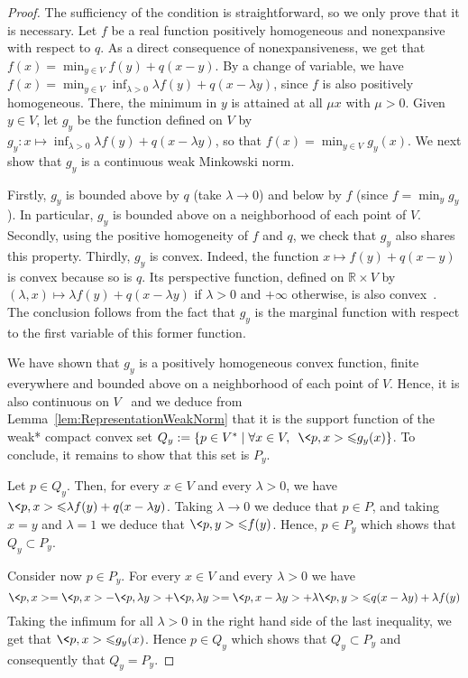 \documentclass[a4paper,11pt]{amsart}
\theoremstyle{definition}
\theoremstyle{remark}
\begin{document}
\begin{proof}
  The sufficiency of the condition is straightforward, so we only prove that it is necessary.
  Let $f$ be a real function positively homogeneous and nonexpansive with respect to $q$.
  As a direct consequence of nonexpansiveness, we get that $f(x) = \min_{y \in V} f(y)+q(x-y)$.
  By a change of variable, we have $f(x) = \min_{y \in V} \inf_{\lambda > 0} \lambda f(y)+q(x-\lambda y)$, since $f$ is also positively homogeneous.
  There, the minimum in $y$ is attained at all $\mu x$ with $\mu > 0$.
  Given $y \in V$, let $g_y$ be the function defined on $V$ by $g_y:x \mapsto \inf_{\lambda > 0} \lambda f(y)+q(x-\lambda y)$, so that $f(x)= \min_{y \in V} g_y(x)$.
  We next show that $g_y$ is a continuous weak Minkowski norm.

  Firstly, $g_y$ is bounded above by $q$ (take $\lambda \to 0$) and below by $f$ (since $f = \min_{y} g_y$).
  In particular, $g_y$ is bounded above on a neighborhood of each point of $V$.
  Secondly, using the positive homogeneity of $f$ and $q$, we check that $g_y$ also shares this property.
  Thirdly, $g_y$ is convex.
  Indeed, the function $x \mapsto f(y)+q(x-y)$ is convex because so is $q$.
  Its perspective function, defined on ${\mathbb{R}} \times V$ by $(\lambda,x) \mapsto \lambda f(y)+q(x-\lambda y)$ if $\lambda>0$ and $+\infty$ otherwise, is also convex~\cite[Proposition 8.23]{BC11}.
  The conclusion follows from the fact that $g_y$ is the marginal function with respect to the first variable of this former function.

  We have shown that $g_y$ is a positively homogeneous convex function, finite everywhere and bounded above on a neighborhood of each point of $V$.
  Hence, it is also continuous on $V$~\cite[Theorem 5.43]{AB06} and we deduce from Lemma~\ref{lem:RepresentationWeakNorm} that it is the support function of the weak* compact convex set $Q_y := \{ p \in V^* \mid \forall x \in V, \enspace \<p,x> {\leqslant} g_y(x) \}$.
  To conclude, it remains to show that this set is $P_y$.

  Let $p \in Q_y$.
  Then, for every $x \in V$ and every $\lambda > 0$, we have $\<p,x> {\leqslant} \lambda f(y) + q(x-\lambda y)$.
  Taking $\lambda \to 0$ we deduce that $p \in P$, and taking $x=y$ and $\lambda = 1$ we deduce that $\<p,y> {\leqslant} f(y)$.
  Hence, $p \in P_y$ which shows that $Q_y \subset P_y$.

  Consider now $p \in P_y$.
  For every $x \in V$ and every $\lambda > 0$ we have
  \begin{equation*}
    \<p,x> = \<p,x> - \<p,\lambda y> + \<p,\lambda y> = \<p,x-\lambda y> + \lambda \<p,y> {\leqslant} q(x-\lambda y) + \lambda f(y)
  \end{equation*}
  Taking the infimum for all $\lambda > 0$ in the right hand side of the last inequality, we get that $\<p,x> {\leqslant} g_y(x)$.
  Hence $p \in Q_y$ which shows that $Q_y \subset P_y$ and consequently that $Q_y = P_y$.
\end{proof}
\end{document}
